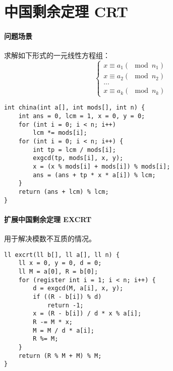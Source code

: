 \section{中国剩余定理 CRT}
\paragraph{问题场景} 求解如下形式的一元线性方程组：
$$\begin{cases}x \equiv a_1 (\mod n_1) \\x \equiv a_2 (\mod n_2) \\... \\x \equiv a_k (\mod n_k)\end{cases}$$
\begin{verbatim}
int china(int a[], int mods[], int n) {
    int ans = 0, lcm = 1, x = 0, y = 0;
    for (int i = 0; i < n; i++)
        lcm *= mods[i];
    for (int i = 0; i < n; i++) {
        int tp = lcm / mods[i];
        exgcd(tp, mods[i], x, y);
        x = (x % mods[i] + mods[i]) % mods[i];
        ans = (ans + tp * x * a[i]) % lcm;
    }
    return (ans + lcm) % lcm;
}
\end{verbatim}
\paragraph{扩展中国剩余定理 EXCRT} 用于解决模数不互质的情况。
\begin{verbatim}
ll excrt(ll b[], ll a[], ll n) {
    ll x = 0, y = 0, d = 0;
    ll M = a[0], R = b[0];
    for (register int i = 1; i < n; i++) {
        d = exgcd(M, a[i], x, y);
        if ((R - b[i]) % d)
            return -1;
        x = (R - b[i]) / d * x % a[i];
        R -= M * x;
        M = M / d * a[i];
        R %= M;
    }
    return (R % M + M) % M;
}
\end{verbatim}